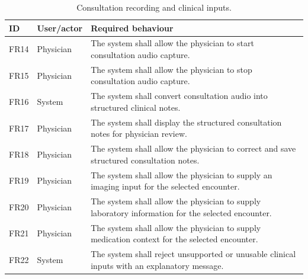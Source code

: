 \begin{table}[htbp]
\centering
\small
\caption{Consultation recording and clinical inputs.}
\label{tab:kashaf:fr-input}
\begin{tabular}{|p{}|p{}|p{}|}
\hline
ID & User/actor & Required behaviour \\ \hline
FR14 & Physician & The system shall allow the physician to start consultation audio capture. \\ \hline
FR15 & Physician & The system shall allow the physician to stop consultation audio capture. \\ \hline
FR16 & System & The system shall convert consultation audio into structured clinical notes. \\ \hline
FR17 & Physician & The system shall display the structured consultation notes for physician review. \\ \hline
FR18 & Physician & The system shall allow the physician to correct and save structured consultation notes. \\ \hline
FR19 & Physician & The system shall allow the physician to supply an imaging input for the selected encounter. \\ \hline
FR20 & Physician & The system shall allow the physician to supply laboratory information for the selected encounter. \\ \hline
FR21 & Physician & The system shall allow the physician to supply medication context for the selected encounter. \\ \hline
FR22 & System & The system shall reject unsupported or unusable clinical inputs with an explanatory message. \\ \hline
\end{tabular}
\end{table}

